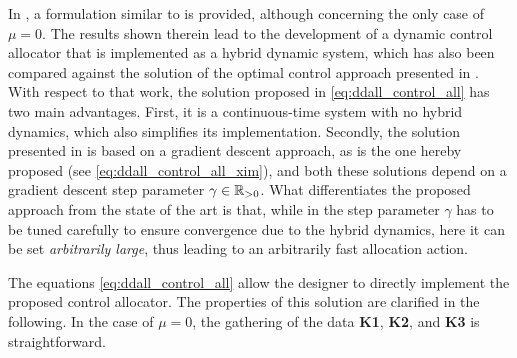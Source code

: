 \begin{remark}
  \label{rem:ddall_galpett}
  In \cite[Problem 1]{galeani_dynamic_2014}, a formulation similar to  is provided, although concerning the only case of $\mu=0$. The results shown therein lead to the development of a dynamic control allocator that is implemented as a hybrid dynamic system, which has also been compared against the solution of the optimal control approach presented in . With respect to that work, the solution proposed in \eqref{eq:ddall_control_all} has two main advantages. First, it is a continuous-time system with no hybrid dynamics, which also simplifies its implementation. Secondly, the solution presented in \cite{galeani_dynamic_2014} is based on a gradient descent approach, as is the one hereby proposed (see \eqref{eq:ddall_control_all_xim}), and both these solutions depend on a gradient descent step parameter $\gamma\in\mathbb{R}_{>0}$. What differentiates the proposed approach from the state of the art is that, while in \cite{galeani_dynamic_2014} the step parameter $\gamma$ has to be tuned carefully to ensure convergence due to the hybrid dynamics, here it can be set \emph{arbitrarily large}, thus leading to an arbitrarily fast allocation action.\closeremark
\end{remark}

The equations \eqref{eq:ddall_control_all} allow the designer to directly implement the proposed control allocator. The properties of this solution are clarified in the following. In the case of $\mu=0$, the gathering of the data \textbf{K1}, \textbf{K2}, and \textbf{K3} is straightforward.

